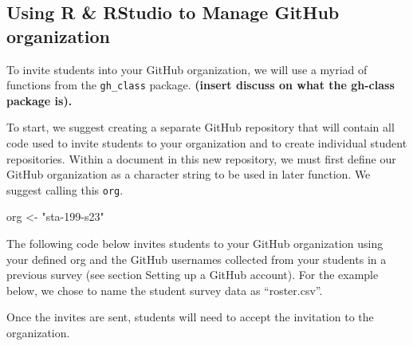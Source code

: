 \documentclass[
  12pt]{article}
\newenvironment{Shaded}{\begin{snugshade}}{\end{snugshade}}
\newcommand{\AttributeTok}[1]{\textcolor[rgb]{0.40,0.45,0.13}{#1}}
\newcommand{\CommentTok}[1]{\textcolor[rgb]{0.37,0.37,0.37}{#1}}
\newcommand{\FunctionTok}[1]{\textcolor[rgb]{0.28,0.35,0.67}{#1}}
\newcommand{\NormalTok}[1]{\textcolor[rgb]{0.00,0.23,0.31}{#1}}
\newcommand{\OtherTok}[1]{\textcolor[rgb]{0.00,0.23,0.31}{#1}}
\newcommand{\SpecialCharTok}[1]{\textcolor[rgb]{0.37,0.37,0.37}{#1}}
\newcommand{\StringTok}[1]{\textcolor[rgb]{0.13,0.47,0.30}{#1}}
\begin{document}
\hypertarget{using-r-rstudio-to-manage-github-organization}{%
\subsection{Using R \& RStudio to Manage GitHub
organization}\label{using-r-rstudio-to-manage-github-organization}}

To invite students into your GitHub organization, we will use a myriad
of functions from the \texttt{gh\_class} package. \textbf{(insert
discuss on what the gh-class package is).}

To start, we suggest creating a separate GitHub repository that will
contain all code used to invite students to your organization and to
create individual student repositories. Within a document in this new
repository, we must first define our GitHub organization as a character
string to be used in later function. We suggest calling this
\texttt{org}.

\begin{Shaded}
\begin{Highlighting}[]
\NormalTok{org }\OtherTok{\textless{}{-}} \StringTok{"sta{-}199{-}s23"}
\end{Highlighting}
\end{Shaded}

The following code below invites students to your GitHub organization
using your defined org and the GitHub usernames collected from your
students in a previous survey (see section Setting up a GitHub account).
For the example below, we chose to name the student survey data as
``roster.csv''.

\begin{Shaded}
\end{Shaded}

Once the invites are sent, students will need to accept the invitation
to the organization.
\end{document}
